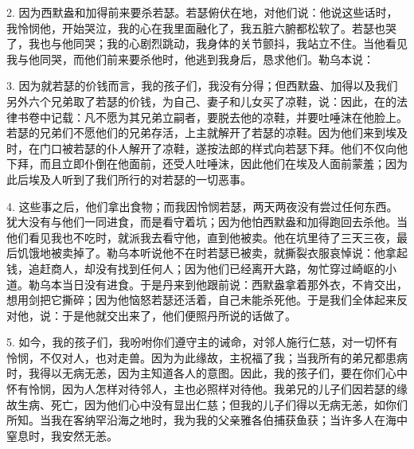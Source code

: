 2. 因为西默盎和加得前来要杀若瑟。若瑟俯伏在地，对他们说：他说这些话时，我怜悯他，开始哭泣，我的心在我里面融化了，我五脏六腑都松软了。若瑟也哭了，我也与他同哭；我的心剧烈跳动，我身体的关节颤抖，我站立不住。当他看见我与他同哭，而他们前来要杀他时，他逃到我身后，恳求他们。勒乌本说：\par

3. 因为就若瑟的价钱而言，我的孩子们，我没有分得；但西默盎、加得以及我们另外六个兄弟取了若瑟的价钱，为自己、妻子和儿女买了凉鞋，说：因此，在的法律书卷中记载：凡不愿为其兄弟立嗣者，要脱去他的凉鞋，并要吐唾沫在他脸上。若瑟的兄弟们不愿他们的兄弟存活，上主就解开了若瑟的凉鞋。因为他们来到埃及时，在门口被若瑟的仆人解开了凉鞋，遂按法郎的样式向若瑟下拜。他们不仅向他下拜，而且立即仆倒在他面前，还受人吐唾沫，因此他们在埃及人面前蒙羞；因为此后埃及人听到了我们所行的对若瑟的一切恶事。\par

4. 这些事之后，他们拿出食物；而我因怜悯若瑟，两天两夜没有尝过任何东西。犹大没有与他们一同进食，而是看守着坑；因为他怕西默盎和加得跑回去杀他。当他们看见我也不吃时，就派我去看守他，直到他被卖。他在坑里待了三天三夜，最后饥饿地被卖掉了。勒乌本听说他不在时若瑟已被卖，就撕裂衣服哀悼说：他拿起钱，追赶商人，却没有找到任何人；因为他们已经离开大路，匆忙穿过崎岖的小道。勒乌本当日没有进食。于是丹来到他跟前说：西默盎拿着那外衣，不肯交出，想用剑把它撕碎；因为他恼怒若瑟还活着，自己未能杀死他。于是我们全体起来反对他，说：于是他就交出来了，他们便照丹所说的话做了。\par

5. 如今，我的孩子们，我吩咐你们遵守主的诫命，对邻人施行仁慈，对一切怀有怜悯，不仅对人，也对走兽。因为为此缘故，主祝福了我；当我所有的弟兄都患病时，我得以无病无恙，因为主知道各人的意图。因此，我的孩子们，要在你们心中怀有怜悯，因为人怎样对待邻人，主也必照样对待他。我弟兄的儿子们因若瑟的缘故生病、死亡，因为他们心中没有显出仁慈；但我的儿子们得以无病无恙，如你们所知。当我在客纳罕沿海之地时，我为我的父亲雅各伯捕获鱼获；当许多人在海中窒息时，我安然无恙。\par

